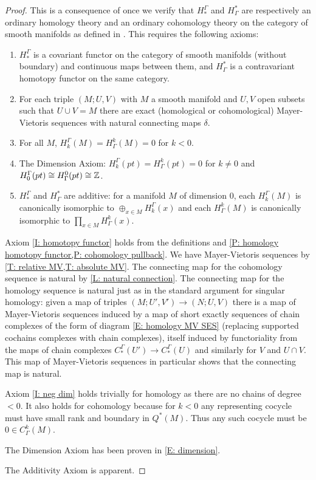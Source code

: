 \begin{proof}
	This is a consequence of \cite[Theorem 10]{Krec10b} once we verify that $H_*^\Gamma$ and $H^*_\Gamma$ are respectively an ordinary homology theory and an ordinary cohomology theory on the category of smooth manifolds as defined in \cite{Krec10b}.
	This requires the following axioms:

	\begin{enumerate}
		\item\label{I: homotopy functor} $H_*^\Gamma$ is a covariant functor on the category of smooth manifolds (without boundary) and continuous maps between them, and $H^*_\Gamma$ is a contravariant homotopy functor on the same category.

		\item For each triple $(M;U,V)$ with $M$ a smooth manifold and $U,V$ open subsets such that $U \cup V = M$ there are exact (homological or cohomological) Mayer-Vietoris sequences with natural connecting maps $\delta$.

		\item\label{I: neg dim} For all $M$, $H_k^\Gamma(M) = H^k_\Gamma(M) = 0$ for $k<0$.

		\item The Dimension Axiom: $H_k^\Gamma(pt) = H^k_\Gamma(pt) = 0$ for $k\neq 0$ and $H^\Gamma_0(pt) \cong H_\Gamma^0(pt) \cong \mathbb{Z}$.

		\item $H_*^\Gamma$ and $H^*_\Gamma$ are additive: for a manifold $M$ of dimension $0$, each $H_k^\Gamma(M)$ is canonically isomorphic to $\oplus_{x \in M} H_k^\Gamma(x)$ and each $H^k_\Gamma(M)$ is canonically isomorphic to $\prod_{x \in M} H^k_\Gamma(x)$.
	\end{enumerate}

	Axiom \ref{I: homotopy functor} holds from the definitions and \cref{P: homology homotopy functor,P: cohomology pullback}.
	We have Mayer-Vietoris sequences by \cref{T: relative MV,T: absolute MV}.
	The connecting map for the cohomology sequence is natural by \cref{L: natural connection}.
	The connecting map for the homology sequence is natural just as in the standard argument for singular homology: given a map of triples $(M;U',V') \to (N;U,V)$ there is a map of Mayer-Vietoris sequences induced by a map of short exactly sequences of chain complexes of the form of diagram \eqref{E: homology MV SES} (replacing supported cochains complexes with chain complexes), itself induced by functoriality from the maps of chain complexes $C_*^{\Gamma}(U') \to C_*^{\Gamma}(U)$ and similarly for $V$ and $U \cap V$.
	This map of Mayer-Vietoris sequences in particular shows that the connecting map is natural.

	Axiom \ref{I: neg dim} holds trivially for homology as there are no chains of degree $<0$.
	It also holds for cohomology because for $k<0$ any representing cocycle must have small rank and boundary in $Q^*(M)$.
	Thus any such cocycle must be $0 \in C^k_\Gamma(M)$.

	The Dimension Axiom has been proven in \cref{E: dimension}.

	The Additivity Axiom is apparent.
\end{proof}

